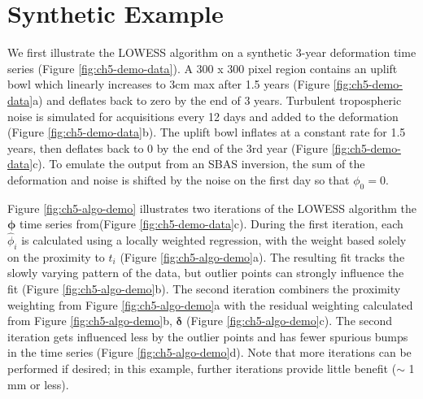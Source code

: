 \section{Synthetic Example}


We first illustrate the LOWESS algorithm on a synthetic 3-year deformation time series (Figure \ref{fig:ch5-demo-data}).
A 300 x 300 pixel region contains an uplift bowl which linearly increases to $ 3 $cm max after 1.5 years (Figure \ref{fig:ch5-demo-data}a) and deflates back to zero by the end of 3 years. Turbulent tropospheric noise is simulated for acquisitions every 12 days and added to the deformation (Figure \ref{fig:ch5-demo-data}b). The uplift bowl inflates at a constant rate for 1.5 years, then deflates back to 0 by the end of the 3rd year (Figure \ref{fig:ch5-demo-data}c).
To emulate the output from an SBAS inversion, the sum of the deformation and noise is shifted by the noise on the first day so that $ \phi_0 = 0 $.




Figure \ref{fig:ch5-algo-demo} illustrates two iterations of the LOWESS algorithm the $ \bm{\phi} $ time series from(Figure \ref{fig:ch5-demo-data}c).
During the first iteration, each $ \hat{\phi}_i $ is calculated using a locally weighted regression, with the weight based solely on the proximity to $ t_i $ (Figure \ref{fig:ch5-algo-demo}a). The resulting fit tracks the slowly varying pattern of the data, but outlier points can strongly influence the fit (Figure \ref{fig:ch5-algo-demo}b). 
The second iteration combiners the proximity weighting from Figure \ref{fig:ch5-algo-demo}a with the residual weighting calculated from Figure \ref{fig:ch5-algo-demo}b, $ \bm{\delta} $ (Figure \ref{fig:ch5-algo-demo}c).
The second iteration gets influenced less by the outlier points and has fewer spurious bumps in the time series (Figure \ref{fig:ch5-algo-demo}d). Note that more iterations can be performed if desired; in this example, further iterations provide little benefit ($ \sim $ 1 mm or less).


